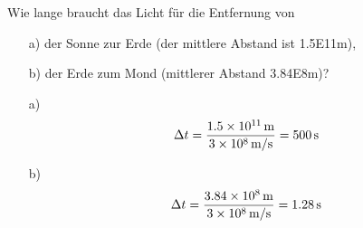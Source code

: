 

\begin{aufgabe}
Wie lange braucht das Licht für die Entfernung von 
\begin{itemize}
	\item[a)] der Sonne zur Erde (der mittlere Abstand ist \num{1.5E11}{m}),
	\item[b)] der Erde zum Mond (mittlerer Abstand \num{3.84E8}{m})?
\end{itemize}

\begin{loesung}
	\begin{itemize}
		\item[a)]
			\begin{equation*}
\Delta t = \frac{\SI{1.5E11}{m}}{\SI{3E8}{m/s}}= \SI{500}{s}
			\end{equation*}
		\item[b)]
			\begin{equation*}
\Delta t = \frac{\SI{3.84E8}{m}}{\SI{3E8}{m/s}}= \SI{1.28}{s}
			\end{equation*}
\end{itemize}
\end{loesung}
\end{aufgabe}
